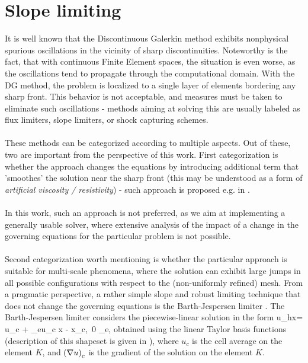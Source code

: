\section{Slope limiting}
It is well known \cite{dolejsi2015} that the Discontinuous Galerkin method exhibits nonphysical spurious oscillations in the vicinity of sharp discontinuities. Noteworthy is the fact, that with continuous Finite Element spaces, the situation is even worse, as the oscillations tend to propagate through the computational domain. With the DG method, the problem is localized to a single layer of elements bordering any sharp front. This behavior is not acceptable, and measures must be taken to eliminate such oscillations - methods aiming at solving this are usually labeled as flux limiters, slope limiters, or shock capturing schemes.
\paragraph{}
These methods can be categorized according to multiple aspects. Out of these, two are important from the perspective of this work. First categorization is whether the approach changes the equations by introducing additional term that 'smoothes' the solution near the sharp front (this may be understood as a form of \textit{artificial viscosity / resistivity}) - such approach is proposed e.g. in \cite{DENNER201759}.
\paragraph{}
In this work, such an approach is not preferred, as we aim at implementing a generally usable solver, where extensive analysis of the impact of a change in the governing equations for the particular problem is not possible.
\paragraph{}
Second categorization worth mentioning is whether the particular approach is suitable for multi-scale phenomena, where the solution can exhibit large jumps in all possible configurations with respect to the (non-uniformly refined) mesh. From a pragmatic perspective, a rather simple slope and robust limiting technique that does not change the governing equations is the Barth-Jespersen limiter \cite{barthJespersen}.
The Barth-Jespersen limiter considers the piecewise-linear solution in the form
\be
\label{slopeLimSln}
u_h\lo x\ro = u_c + \alpha_e\lo\nabla u\ro_c \cdot \lo x - x_c\ro,\ 0 \leq \alpha_e,
\ee
obtained using the linear Taylor basis functions (description of this shapeset is given in \cite{KuzminVertex}), where $u_c$ is the cell average on the element $K$, and $\left(\nabla u\right)_c$ is the gradient of the solution on the element $K$.
